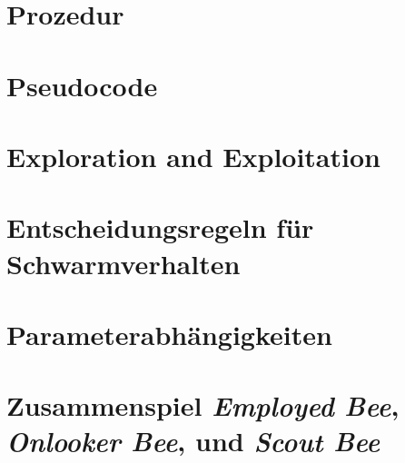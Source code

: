 
\section{Prozedur}

\section{Pseudocode}

\section{Exploration and Exploitation}

\section{Entscheidungsregeln für Schwarmverhalten}

\section{Parameterabhängigkeiten}

\section{Zusammenspiel \emph{Employed Bee}, \emph{Onlooker Bee}, und
    \emph{Scout Bee}}